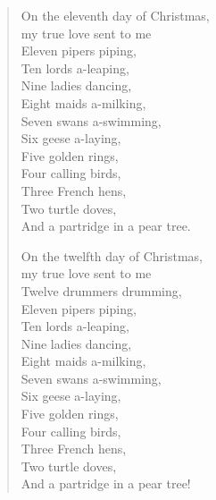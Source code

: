 \begin{verse}
\medskip

On the eleventh day of Christmas, \\ 
my true love sent to me \\
Eleven pipers piping, \\
Ten lords a-leaping, \\
Nine ladies dancing, \\
Eight maids a-milking, \\
Seven swans a-swimming, \\
Six geese a-laying, \\
Five golden rings, \\
Four calling birds, \\
Three French hens, \\
Two turtle doves, \\
And a partridge in a pear tree.

\medskip

On the twelfth day of Christmas, \\ 
my true love sent to me \\
Twelve drummers drumming, \\
Eleven pipers piping, \\
Ten lords a-leaping, \\
Nine ladies dancing, \\
Eight maids a-milking, \\
Seven swans a-swimming, \\
Six geese a-laying, \\
Five golden rings, \\
Four calling birds, \\
Three French hens, \\
Two turtle doves, \\
And a partridge in a pear tree! 
\end{verse}